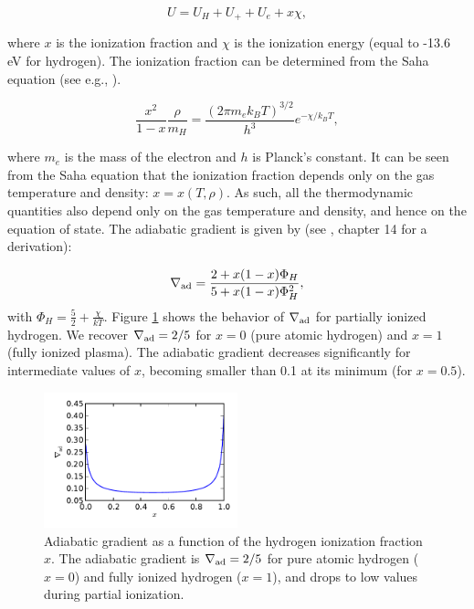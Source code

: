 \documentclass[apj]{emulateapj}
\newcommand{\delad}{\nabla_{\rm ad}}
\begin{document}
\begin{equation}
U=U_H+U_+ + U_e + x \chi,
\end{equation}

\noindent where $x$ is the ionization fraction and $\chi$ is the ionization energy (equal to -13.6 eV for hydrogen). The ionization fraction can be determined from the Saha equation (see e.g., \citealt{kippenhahn90}).

\begin{equation}
\label{eq:saha}
\frac{x^2}{1-x} \frac{\rho}{m_H}=\frac{(2 \pi m_e k_B T)^{3/2}}{h^3} e^{-\chi/k_B T},
\end{equation}

\noindent where $m_e$ is the mass of the electron and $h$ is Planck's constant. It can be seen from the Saha equation that the ionization fraction depends only on the gas temperature and density: $x=x(T, \rho)$. As such, all the thermodynamic quantities also depend only on the gas temperature and density, and hence on the equation of state. The adiabatic gradient is given by (see \citealt{kippenhahn90}, chapter 14 for a derivation):

\begin{equation}
\delad=\frac{2+x (1-x) \Phi_H}{5+x (1-x) \Phi_H^2},
\end{equation} 
with $\Phi_H=\frac{5}{2}+\frac{\chi}{k T}$. Figure \ref{fig:deladion} shows the behavior of $\delad$ for partially ionized hydrogen. We recover $\delad=2/5$ for $x=0$ (pure atomic hydrogen) and $x=1$ (fully ionized plasma). The adiabatic gradient decreases significantly for intermediate values of $x$, becoming smaller than 0.1 at its minimum (for $x=0.5$). 

\begin{figure}[h]
\centering
\includegraphics[width=0.5\textwidth]{../../figs/ModelAtmospheres/RadSelfGravRealEOS/PaperFigs/delad_dissociation.pdf}
\caption{Adiabatic gradient as a function of the hydrogen ionization fraction $x$. The adiabatic gradient is $\delad=2/5$ for pure atomic hydrogen ($x=0$) and fully ionized hydrogen ($x=1$), and drops to low values during partial ionization.}
\label{fig:deladion}
\end{figure}
\end{document}
